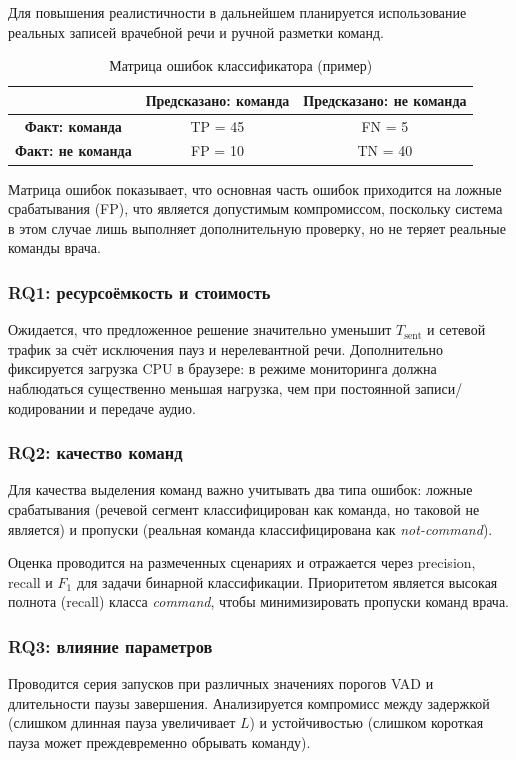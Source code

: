 Для повышения реалистичности в дальнейшем планируется использование реальных записей врачебной речи и ручной разметки команд.

\begin{table}[t]
    \centering
    \caption{Матрица ошибок классификатора (пример)}
    \label{tab:confusion}
    \begin{tabular}{|c|c|c|}
    \hline
     & \textbf{Предсказано: команда} & \textbf{Предсказано: не команда} \\
    \hline
    \textbf{Факт: команда} & TP = 45 & FN = 5 \\
    \hline
    \textbf{Факт: не команда} & FP = 10 & TN = 40 \\
    \hline
    \end{tabular}
\end{table}
Матрица ошибок показывает, что основная часть ошибок приходится на ложные срабатывания (FP), что является допустимым компромиссом, поскольку система в этом случае лишь выполняет дополнительную проверку, но не теряет реальные команды врача.

\subsubsection{RQ1: ресурсоёмкость и стоимость}
Ожидается, что предложенное решение значительно уменьшит $T_{\text{sent}}$ и сетевой трафик за счёт исключения пауз и нерелевантной речи.
Дополнительно фиксируется загрузка CPU в браузере: в режиме мониторинга должна наблюдаться существенно меньшая нагрузка, чем при постоянной записи/кодировании и передаче аудио.

\subsubsection{RQ2: качество команд}
Для качества выделения команд важно учитывать два типа ошибок: ложные срабатывания (речевой сегмент классифицирован как команда, но таковой не является) и пропуски (реальная команда классифицирована как \textit{not-command}).

Оценка проводится на размеченных сценариях и отражается через precision, recall и $F_1$ для задачи бинарной классификации.
Приоритетом является высокая полнота (recall) класса \textit{command}, чтобы минимизировать пропуски команд врача.

\subsubsection{RQ3: влияние параметров}
Проводится серия запусков при различных значениях порогов VAD и длительности паузы завершения.
Анализируется компромисс между задержкой (слишком длинная пауза увеличивает $L$) и устойчивостью (слишком короткая пауза может преждевременно обрывать команду).

